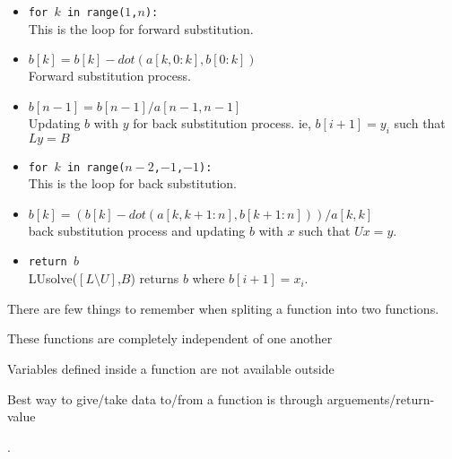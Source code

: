 \begin{remark}
\begin{commentary}
\begin{itemize}
	\item \texttt{for $k$ in range($1$,$n$):} \\ This is the loop for forward substitution.
	\item \texttt{$b[k] = b[k]-dot(a[k,0:k],b[0:k])$} \\ Forward substitution process.
	\item \texttt{$b[n-1] = b[n-1]/a[n-1,n-1]$} \\ Updating $b$ with $y$ for back substitution process. ie, $b[i+1]=y_i$ such that $Ly = B$
	\item \texttt{for $k$ in range($n-2$,$-1$,$-1$):}  \\ This is the loop for back substitution.
	\item \texttt{$b[k] = (b[k] - dot(a[k,k+1:n],b[k+1:n]))/a[k,k]$} \\ back substitution process and updating $b$ with $x$ such that $Ux = y$.
	\item \texttt{return $b$} \\ LUsolve($[L\text{\textbackslash{}}U]$,$B$) returns $b$ where $b[i+1]=x_i$.
\end{itemize}
	There are few things to remember when spliting a function into two functions. \begin{enumerate*} \item These functions are completely independent of one another \item Variables defined inside a function are not available outside \item Best way to give/take data to/from a function is through arguements/return-value \end{enumerate*}.
\end{commentary}
\end{remark}

